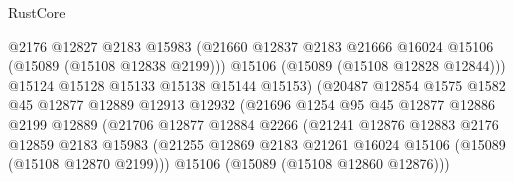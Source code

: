 \begin{lexlean}{RustCore}
\begin{coremodule}
                                      @2176
                                      @12827
                                      @2183
                                      @15983
                                      (@21660
                                        @12837
                                        @2183
                                        @21666
                                        @16024
                                        @15106
                                        (@15089 (@15108 @12838 @2199)))
                                      @15106
                                      (@15089 (@15108 @12828 @12844)))
                                    @15124
                                    @15128
                                    @15133
                                    @15138
                                    @15144
                                    @15153)
                                  (@20487
                                    @12854
                                    @1575
                                    @1582
                                    @45
                                    @12877
                                    @12889
                                    @12913
                                    @12932
                                    (@21696
                                      @1254
                                      @95
                                      @45
                                      @12877
                                      @12886
                                      @2199
                                      @12889
                                      (@21706
                                        @12877
                                        @12884
                                        @2266
                                        (@21241
                                          @12876
                                          @12883
                                          @2176
                                          @12859
                                          @2183
                                          @15983
                                          (@21255
                                            @12869
                                            @2183
                                            @21261
                                            @16024
                                            @15106
                                            (@15089 (@15108 @12870 @2199)))
                                          @15106
                                          (@15089 (@15108 @12860 @12876)))

\end{coremodule}
\end{lexlean}
